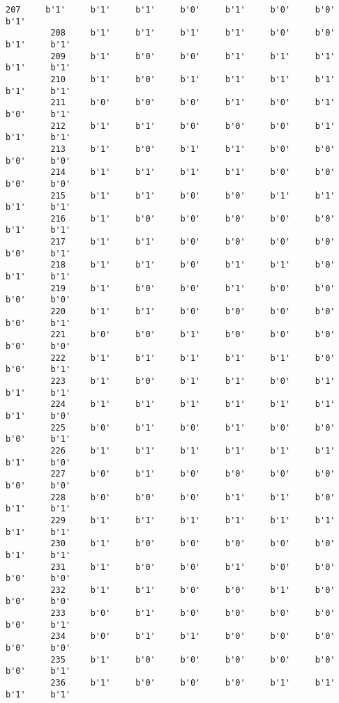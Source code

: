 \documentclass[11pt]{article}
\begin{document}
\begin{Verbatim}[commandchars=\\\{\}]
         207     b'1'     b'1'     b'1'     b'0'     b'1'     b'0'     b'0'     b'1'   
         208     b'1'     b'1'     b'1'     b'1'     b'0'     b'0'     b'1'     b'1'   
         209     b'1'     b'0'     b'0'     b'1'     b'1'     b'1'     b'1'     b'1'   
         210     b'1'     b'0'     b'1'     b'1'     b'1'     b'1'     b'1'     b'1'   
         211     b'0'     b'0'     b'0'     b'1'     b'0'     b'1'     b'0'     b'1'   
         212     b'1'     b'1'     b'0'     b'0'     b'0'     b'1'     b'1'     b'1'   
         213     b'1'     b'0'     b'1'     b'1'     b'0'     b'0'     b'0'     b'0'   
         214     b'1'     b'1'     b'1'     b'1'     b'0'     b'0'     b'0'     b'0'   
         215     b'1'     b'1'     b'0'     b'0'     b'1'     b'1'     b'1'     b'1'   
         216     b'1'     b'0'     b'0'     b'0'     b'0'     b'0'     b'1'     b'1'   
         217     b'1'     b'1'     b'0'     b'0'     b'0'     b'0'     b'0'     b'1'   
         218     b'1'     b'1'     b'0'     b'1'     b'1'     b'0'     b'1'     b'1'   
         219     b'1'     b'0'     b'0'     b'1'     b'0'     b'0'     b'0'     b'0'   
         220     b'1'     b'1'     b'0'     b'0'     b'0'     b'0'     b'0'     b'1'   
         221     b'0'     b'0'     b'1'     b'0'     b'0'     b'0'     b'0'     b'0'   
         222     b'1'     b'1'     b'1'     b'1'     b'1'     b'0'     b'0'     b'1'   
         223     b'1'     b'0'     b'1'     b'1'     b'0'     b'1'     b'1'     b'1'   
         224     b'1'     b'1'     b'1'     b'1'     b'1'     b'1'     b'1'     b'0'   
         225     b'0'     b'1'     b'0'     b'1'     b'0'     b'0'     b'0'     b'1'   
         226     b'1'     b'1'     b'1'     b'1'     b'1'     b'1'     b'1'     b'0'   
         227     b'0'     b'1'     b'0'     b'0'     b'0'     b'0'     b'0'     b'0'   
         228     b'0'     b'0'     b'0'     b'1'     b'1'     b'0'     b'1'     b'1'   
         229     b'1'     b'1'     b'1'     b'1'     b'1'     b'1'     b'1'     b'1'   
         230     b'1'     b'0'     b'0'     b'0'     b'0'     b'0'     b'1'     b'1'   
         231     b'1'     b'0'     b'0'     b'1'     b'0'     b'0'     b'0'     b'0'   
         232     b'1'     b'1'     b'0'     b'0'     b'1'     b'0'     b'0'     b'0'   
         233     b'0'     b'1'     b'0'     b'0'     b'0'     b'0'     b'0'     b'1'   
         234     b'0'     b'1'     b'1'     b'0'     b'0'     b'0'     b'0'     b'0'   
         235     b'1'     b'0'     b'0'     b'0'     b'0'     b'0'     b'0'     b'1'   
         236     b'1'     b'0'     b'0'     b'0'     b'1'     b'1'     b'1'     b'1'   

\end{Verbatim}
\end{document}
